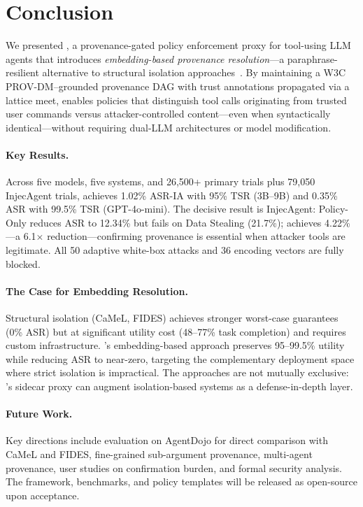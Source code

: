 \section{Conclusion}
\label{sec:conclusion}

We presented \sys{}, a provenance-gated policy enforcement proxy for tool-using LLM agents that introduces \emph{embedding-based provenance resolution}---a paraphrase-resilient alternative to structural isolation approaches~\cite{camel2025,fides2025}. By maintaining a W3C PROV-DM--grounded provenance DAG with trust annotations propagated via a lattice meet, \sys{} enables policies that distinguish tool calls originating from trusted user commands versus attacker-controlled content---even when syntactically identical---without requiring dual-LLM architectures or model modification.

\paragraph{Key Results.}
Across five models, five systems, and 26{,}500+ primary trials plus 79{,}050 InjecAgent trials, \sys{} achieves 1.02\% ASR-IA with 95\% TSR (3B--9B) and 0.35\% ASR with 99.5\% TSR (GPT-4o-mini). The decisive result is InjecAgent: Policy-Only reduces ASR to 12.34\% but fails on Data Stealing (21.7\%); \sys{} achieves 4.22\%---a 6.1$\times$ reduction---confirming provenance is essential when attacker tools are legitimate. All 50 adaptive white-box attacks and 36 encoding vectors are fully blocked.

\paragraph{The Case for Embedding Resolution.}
Structural isolation (CaMeL, FIDES) achieves stronger worst-case guarantees (0\% ASR) but at significant utility cost (48--77\% task completion) and requires custom infrastructure. \sys{}'s embedding-based approach preserves 95--99.5\% utility while reducing ASR to near-zero, targeting the complementary deployment space where strict isolation is impractical. The approaches are not mutually exclusive: \sys{}'s sidecar proxy can augment isolation-based systems as a defense-in-depth layer.

\paragraph{Future Work.}
Key directions include evaluation on AgentDojo for direct comparison with CaMeL and FIDES, fine-grained sub-argument provenance, multi-agent provenance, user studies on confirmation burden, and formal security analysis. The framework, benchmarks, and policy templates will be released as open-source upon acceptance.
